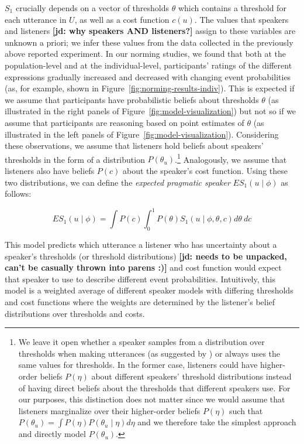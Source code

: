 \documentclass[lucida,biblatex]{sp} %
\newcommand{\jd}[1]{\textcolor{PinkyPurple}{\textbf{[jd: #1]}}}
\begin{document}
$S_1$ crucially depends on a vector of thresholds $\theta$ which contains a threshold for each utterance in $U$, 
as well as  a cost function $c(u)$. The values that speakers and listeners \jd{why speakers AND listeners?} assign 
to these variables are unknown a priori; we infer these values from the data collected in the previously above reported experiment. In our norming studies, we found that both at the population-level and at the individual-level, 
participants' ratings of the different expressions gradually increased and decreased with changing event probabilities 
(as, for example, shown in Figure~\ref{fig:norming-results-indiv}). This is expected if we assume that participants
have probabilistic beliefs about thresholds $\theta$ (as illustrated in the right panels of Figure~\ref{fig:model-visualization}) but not so if we assume that
participants are reasoning based on point estimates of $\theta$ (as illustrated in the left panels of Figure~\ref{fig:model-visualization}).
Considering these observations,  we assume that listeners hold beliefs about speakers' thresholds  in the form of a distribution $P\left(\theta_u\right)$.\footnote{We leave it open 
whether a speaker samples from a distribution over thresholds when making utterances (as suggested by \citet{Qing2015}) 
or always uses the same values for thresholds. In the former case, listeners could have higher-order beliefs  $P(\eta)$ 
about different speakers' threshold distributions instead of having direct beliefs about the thresholds that different 
speakers use. For our purposes, this distinction does not matter since we would assume that listeners marginalize over their higher-order beliefs $P(\eta)$ such that  $P\left(\theta_u\right) = \int P\left(\eta\right) P\left(\theta_u \mid \eta\right) d\eta$ and we therefore take the simplest approach and directly model $P\left(\theta_u\right)$. } Analogously, we assume that listeners also have beliefs $P(c)$ about the speaker's cost function.
Using these two distributions, we can define the \textit{expected pragmatic speaker} $ES_1\left(u \mid \phi \right)$ as follows:

$$ES_1\left(u \mid \phi \right) = \int P(c) \int_0^1 P(\theta) S_1\left(u \mid \phi, \theta, c\right) d\theta \  d c$$

This model predicts which utterance a listener who has uncertainty about a speaker's thresholds (or threshold distributions) \jd{needs to be unpacked, can't be casually thrown into parens :)} and cost function would expect that speaker to use to describe different event probabilities.
Intuitively, this model is a weighted average of different speaker models with differing thresholds and cost functions where the weights are determined by the listener's belief distributions over thresholds
and costs. 
\end{document}
